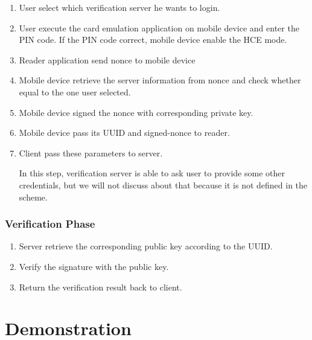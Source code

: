 \begin{CJK}{Bg5}{bsmi}
{{\begin{enumerate}
Notice that users have to swipe their device to the NFC reader in 30 seconds right after the reader start scanning. Otherwise, it will send a timeout message to browser.

\item User select which verification server he wants to login.
\item User execute the card emulation application on mobile device and enter the PIN code. If the PIN code correct, mobile device enable the HCE mode.
\item Reader application send nonce to mobile device
\item Mobile device retrieve the server information from nonce and check whether equal to the one user selected.
\item Mobile device signed the nonce with corresponding private key.
\item Mobile device pass its UUID and signed-nonce to reader.
\item Client pass these parameters to server.

In this step, verification server is able to ask user to provide some other credentials, but we will not discuss about that because it is not defined in the scheme.

\end{enumerate}

\subsubsection{Verification Phase}

\begin{enumerate}
\item Server retrieve the corresponding public key according to the UUID.
\item Verify the signature with the public key.
\item Return the verification result back to client.
\end{enumerate}

\section{Demonstration}



}}
\end{CJK}
